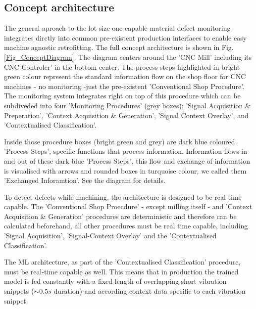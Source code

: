 \documentclass[5p,times,procedia]{elsarticle}
\begin{document}
\subsection{Concept architecture}\label{Sec_ConceptArchitecture}
\vspace*{-\baselineskip}
The general aproach to the lot size one capable material defect monitoring integrates dirctly into common pre-existent production interfaces to enable easy machine agnostic retrofitting. The full concept architecture is shown in Fig. \ref{Fig_ConceptDiagram}.
The diagram centers around the 'CNC Mill' including its CNC Controler' in the bottom center. The process steps highlighted in bright green colour represent the standard information flow on the shop floor for CNC machines - no monitoring -just the pre-existent 'Conventional Shop Procedure'.
The monitoring system integrates right on top of this procedure which can be subdiveded into four 'Monitoring Procedures' (grey boxes): 'Signal Acquisition \& Preperation', 'Context Acquisition \& Generation', 'Signal Context Overlay', and 'Contextualised Classification'.

Inside those procedure boxes (bright green and grey) are dark blue coloured 'Process Steps', specific functions that process information. Information flows in and out of these dark blue 'Process Steps', this flow and exchange of information is visualised with arrows and rounded boxes in turquoise colour, we called them 'Exchanged Inforamtion'.
See the diagram for details.

To detect defects while machining, the architecture is designed to be real-time capable. The 'Conventional Shop Proecdure' - except milling itself - and 'Context Acquisition \& Generation' procedures are deterministic and therefore can be calculated beforehand, all other procedures must be real time capable, including 'Signal Acquisition', 'Signal-Context Overlay' and the 'Contextualised Classification'.

The ML architecture, as part of the 'Contextualised Classification' procedure, must be real-time capable as well. This means that in production the trained model is fed constantly with a fixed length of overlapping short vibration snippets ($\sim0.5 s$ duration) and according context data specific to each vibration snippet.  
\end{document}
